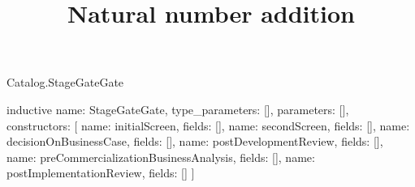 \begin{lexlean}{Catalog.StageGateGate}
\title{Natural number addition}
\begin{semanticmodule}
inductive{
  name: StageGateGate,
  type_parameters: [],
  parameters: [],
  constructors: [
    {name: initialScreen, fields: []},
    {name: secondScreen, fields: []},
    {name: decisionOnBusinessCase, fields: []},
    {name: postDevelopmentReview, fields: []},
    {name: preCommercializationBusinessAnalysis, fields: []},
    {name: postImplementationReview, fields: []}
  ]
}
\end{semanticmodule}
\end{lexlean}
